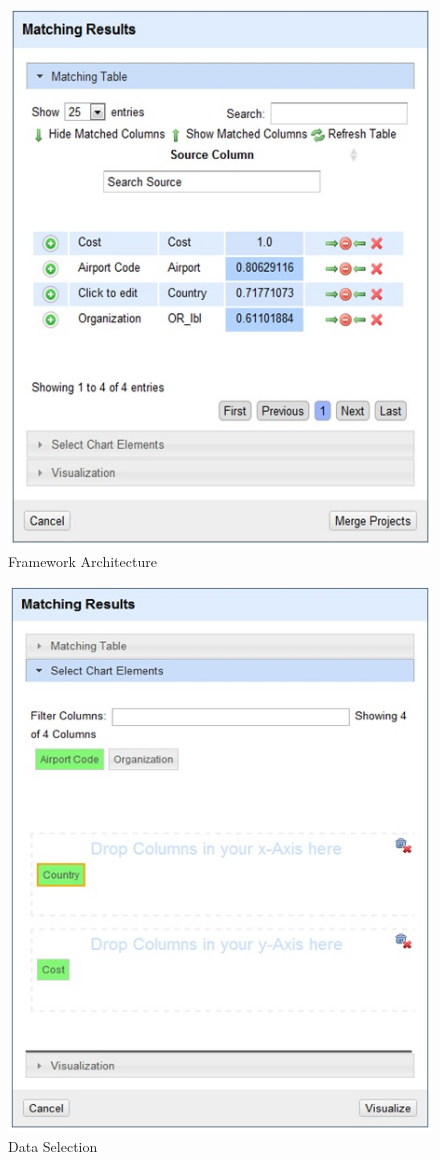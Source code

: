 \documentclass{sig-alternate}
\begin{document}
\begin{figure}[ht!]
  \centering
    \includegraphics[scale=0.6]{1.jpg}
  \caption{Framework Architecture}
  \label{fig:3}
\end{figure}

\begin{figure}[ht!]
  \centering
    \includegraphics[scale=0.6]{2.jpg}
  \caption{Data Selection}
  \label{fig:3}
\end{figure}
\end{document}
